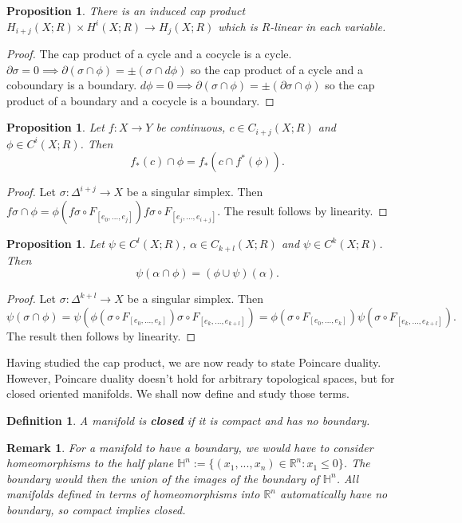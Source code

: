\documentclass{article}
\newtheorem{definition}[theorem]{Definition}
\newtheorem{proposition}[theorem]{Proposition}
\newtheorem{remark}[theorem]{Remark}
\begin{document}
\begin{proposition}
There is an induced cap product $H_{i+j}(X;R)\times H^i(X;R)\to H_j(X;R)$ which is $R$-linear in each variable.
\end{proposition}
\begin{proof}
The cap product of a cycle and a cocycle is a cycle. $\partial\sigma=0\implies\partial(\sigma\cap\phi)=\pm(\sigma\cap d\phi)$ so the cap product of a cycle and a coboundary is a boundary. $d\phi=0\implies\partial(\sigma\cap\phi)=\pm(\partial\sigma\cap\phi)$ so the cap product of a boundary and a cocycle is a boundary.
\end{proof}

\begin{proposition}
Let $f\colon X\to Y$ be continuous, $c\in C_{i+j}(X;R)$ and $\phi\in C^i(X;R)$. Then \[f_*(c)\cap\phi=f_*(c\cap f^*(\phi)).\]
\end{proposition}
\begin{proof}
Let $\sigma\colon\Delta^{i+j}\to X$ be a singular simplex. Then $f\sigma\cap\phi=\phi(f\sigma\circ F_{[e_0,...,e_j]})f\sigma\circ F_{[e_j,...,e_{i+j}]}$.
The result follows by linearity.
\end{proof}

\begin{proposition}
Let $\psi\in C^l(X;R)$, $\alpha\in C_{k+l}(X;R)$ and $\psi\in C^k(X;R)$. Then \[\psi(\alpha\cap\phi)=(\phi\cup\psi)(\alpha).\]
\end{proposition}
\begin{proof}
Let $\sigma\colon\Delta^{k+l}\to X$ be a singular simplex. Then \[\psi(\sigma\cap\phi)=\psi(\phi(\sigma\circ F_{[e_0,...,e_k]})\sigma\circ F_{[e_k,...,e_{k+l}]})=\phi(\sigma\circ F_{[e_0,...,e_k]})\psi(\sigma\circ F_{[e_k,...,e_{k+l}]}).\]
The result then follows by linearity.
\end{proof}

\noindent Having studied the cap product, we are now ready to state Poincare duality. However, Poincare duality doesn't hold for arbitrary topological spaces, but for closed oriented manifolds. We shall now define and study those terms.



\begin{definition}
A manifold is \textbf{closed} if it is compact and has no boundary.
\end{definition}

\begin{remark}
For a manifold to have a boundary, we would have to consider homeomorphisms to the half plane $\mathbb{H}^n:=\{(x_1,...,x_n)\in\mathbb{R}^n:x_1\leq0\}$. The boundary would then the union of the images of the boundary of $\mathbb{H}^n$. All manifolds defined in terms of homeomorphisms into $\mathbb{R}^n$ automatically have no boundary, so compact implies closed.
\end{remark}
\end{document}

